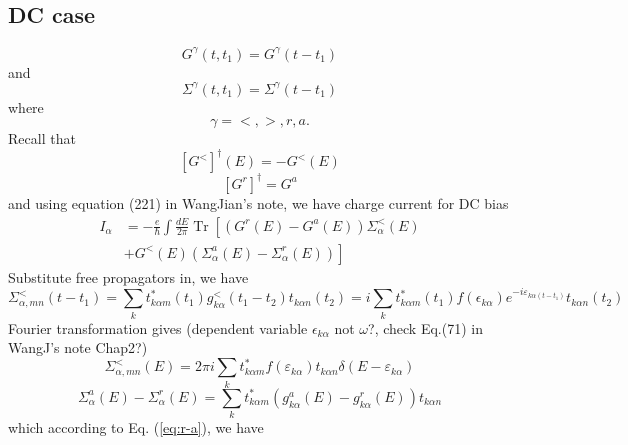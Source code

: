 \documentclass[aps,prb,superscriptaddress]{revtex4-2}
\begin{document}
\subsection{DC case}
\begin{equation}
G^{\gamma}\left(t, t_{1}\right)=G^{\gamma}\left(t-t_{1}\right)
\end{equation}
and
\begin{equation}
\Sigma^{\gamma}\left(t, t_{1}\right)=\Sigma^{\gamma}\left(t-t_{1}\right)
\end{equation}
where
\begin{equation}
\gamma=<,>, r, a.
\end{equation}
Recall that
\begin{equation}
\left[G^{<}\right]^{\dagger}(E)=-G^{<}(E)
\end{equation}
\begin{equation}
\left[G^{r}\right]^{\dagger}=G^{a}
\end{equation}
and using equation (221) in WangJian's note, we have charge current for DC bias
\begin{equation}
\begin{aligned}
I_{\alpha} &=-\frac{e}{\hbar} \int \frac{d E}{2 \pi} \operatorname{Tr}\left[\left(G^{r}(E)-G^{a}(E)\right) \Sigma_{\alpha}^{<}(E)\right.\\
&\left.+G^{<}(E)\left(\Sigma_{\alpha}^{a}(E)-\Sigma_{\alpha}^{r}(E)\right)\right]
\end{aligned}
\label{eq:current1}
\end{equation}
Substitute free propagators in, we have
\begin{equation}
\Sigma_{\alpha,mn}^{<}(t-t_{1}) = \sum_{k} t_{k\alpha m}^{*}(t_{1}) g_{k\alpha}^{<}(t_{1}-t_{2}) t_{k\alpha n}(t_{2}) = i\sum_{k} t_{k\alpha m}^{*}(t_{1}) f(\epsilon_{k\alpha})e^{-i\varepsilon_{k\alpha(t-t_{1})}}t_{k\alpha n}(t_{2})
\end{equation}
Fourier transformation gives (dependent variable $\epsilon_{k\alpha}$ not $\omega$?, check Eq.(71) in WangJ's note Chap2?)
\begin{equation}
\Sigma_{\alpha,mn}^{<}(E) = 2\pi i\sum_{k}t_{k\alpha m}^{*}f(\varepsilon_{k\alpha})t_{k\alpha n} \delta(E-\varepsilon_{k\alpha})
\end{equation}
\begin{equation}
\Sigma_{\alpha}^{a}(E)-\Sigma_{\alpha}^{r}(E) = \sum_{k}t_{k\alpha m}^{*}(g_{k\alpha}^{a}(E)-g_{k\alpha}^{r}(E))t_{k\alpha n}
\end{equation}
which according to Eq. (\ref{eq:r-a}), we have
\end{document}
